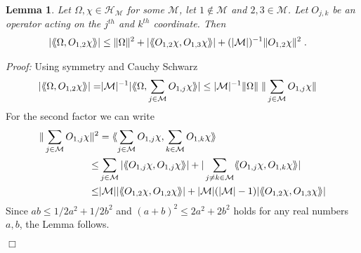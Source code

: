 \documentclass[11pt, english, american]{article}
\newcommand{\laa}{\langle\hspace{-0.08cm}\langle}
\newcommand{\raa}{\rangle\hspace{-0.08cm}\rangle}
\newtheorem{lemma}[theorem]{Lemma}
\newenvironment{proof}{\emph{Proof:}}{\begin{flushright} $ \Box $ \end{flushright}}
\begin{document}
\begin{lemma}\label{trick}
Let $\Omega,\chi\in \mathcal{H}_{\mathcal{M}}$ for some $\mathcal{M}$, let $1\notin\mathcal{M}$ and $2,3\in\mathcal{M}$.
Let $O_{j,k}$ be an operator acting on the $j^{th}$ and $k^{th}$  coordinate. Then
\begin{align*}
|\laa\Omega,O_{1,2}\chi\raa|&\leq \|\Omega\|^2+\left|\laa O_{1,2}\chi,O_{1,3}\chi\raa\right|+(|\mathcal{M}|)^{-1}\|O_{1,2}\chi\|^2
%
\;.
\end{align*}
\end{lemma}
\begin{proof}
Using symmetry and Cauchy Schwarz
\begin{align*}
|\laa\Omega,O_{1,2}\chi\raa|=&|\mathcal{M}|^{-1}|\laa\Omega,\sum_{j\in\mathcal{M}} O_{1,j}\chi\raa|\leq|\mathcal{M}|^{-1}\|\Omega\|\;\|\sum_{j\in\mathcal{M}} O_{1,j}\chi\|
\end{align*}
For the second factor we can write
\begin{align*}
\|\sum_{j\in\mathcal{M}} O_{1,j}\chi\|^2&=\laa\sum_{j\in\mathcal{M}} O_{1,j}\chi,\sum_{k\in\mathcal{M}} O_{1,k}\chi\raa
%
\\\leq&\sum_{j\in\mathcal{M}}|\laa O_{1,j}\chi,O_{1,j}\chi\raa|+|\sum_{j\neq k\in\mathcal{M}}\laa O_{1,j}\chi,O_{1,k}\chi\raa|
%
\\\leq&|\mathcal{M}||\laa O_{1,2}\chi,O_{1,2}\chi\raa|+|\mathcal{M}|(|\mathcal{M}|-1)|\laa O_{1,2}\chi,O_{1,3}\chi\raa|
\end{align*}
Since $ab\leq 1/2a^2+1/2b^2$ and $(a+b)^2\leq 2a^2+2b^2$ holds for any real numbers $a,b$, the Lemma follows.
\end{proof}
\end{document}
